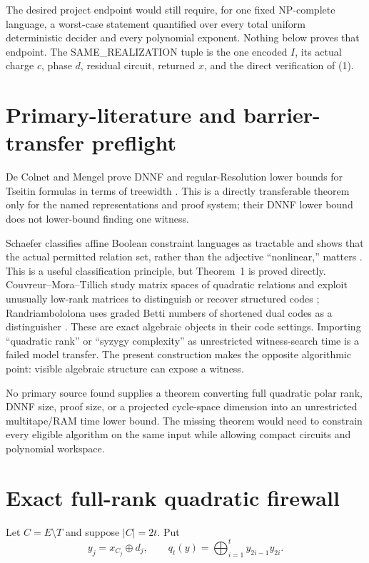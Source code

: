 \documentclass[11pt]{article}
\begin{document}
The desired project endpoint would still require, for one fixed NP-complete
language, a worst-case statement quantified over every total uniform
deterministic decider and every polynomial exponent.  Nothing below proves
that endpoint.  The SAME\_REALIZATION tuple is the one encoded $I$, its actual
charge $c$, phase $d$, residual circuit, returned $x$, and the direct
verification of (1).

\section{Primary-literature and barrier-transfer preflight}
De Colnet and Mengel prove DNNF and regular-Resolution lower bounds for
Tseitin formulas in terms of treewidth \cite{dCM}.  This is a directly
transferable theorem only for the named representations and proof system;
their DNNF lower bound does not lower-bound finding one witness.

Schaefer classifies affine Boolean constraint languages as tractable and
shows that the actual permitted relation set, rather than the adjective
``nonlinear,'' matters \cite{Schaefer}.  This is a useful classification
principle, but Theorem~1 is proved directly.  Couvreur--Mora--Tillich study
matrix spaces of quadratic relations and exploit unusually low-rank matrices
to distinguish or recover structured codes \cite{CMT}; Randriambololona uses
graded Betti numbers of shortened dual codes as a distinguisher \cite{Rand}.
These are exact algebraic objects in their code settings.  Importing
``quadratic rank'' or ``syzygy complexity'' as unrestricted witness-search
time is a failed model transfer.  The present construction makes the opposite
algorithmic point: visible algebraic structure can expose a witness.

No primary source found supplies a theorem converting full quadratic polar
rank, DNNF size, proof size, or a projected cycle-space dimension into an
unrestricted multitape/RAM time lower bound.  The missing theorem would need
to constrain every eligible algorithm on the same input while allowing
compact circuits and polynomial workspace.

\section{Exact full-rank quadratic firewall}
Let $C=E\setminus T$ and suppose $|C|=2t$.  Put
\[
 y_j=x_{C_j}\oplus d_j,
 \qquad
 q_t(y)=\bigoplus_{i=1}^{t}y_{2i-1}y_{2i}.                 \tag{2}
\]
\end{document}
